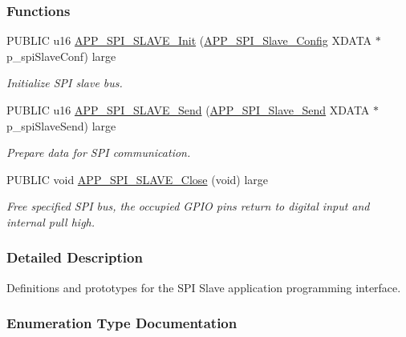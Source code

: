 \subsubsection*{Functions}
\begin{DoxyCompactItemize}
\item 
P\+U\+B\+L\+IC u16 \hyperlink{group___s_p_i___s_l_a_v_e_ga6d740478fb33ff060db8a06a1d8f502c}{A\+P\+P\+\_\+\+S\+P\+I\+\_\+\+S\+L\+A\+V\+E\+\_\+\+Init} (\hyperlink{struct_a_p_p___s_p_i___slave___config}{A\+P\+P\+\_\+\+S\+P\+I\+\_\+\+Slave\+\_\+\+Config} X\+D\+A\+TA $\ast$p\+\_\+spi\+Slave\+Conf) large
\begin{DoxyCompactList}\small\item\em Initialize S\+PI slave bus. \end{DoxyCompactList}\item 
P\+U\+B\+L\+IC u16 \hyperlink{group___s_p_i___s_l_a_v_e_gaca825a871abdd7096640f0a291d59385}{A\+P\+P\+\_\+\+S\+P\+I\+\_\+\+S\+L\+A\+V\+E\+\_\+\+Send} (\hyperlink{struct_a_p_p___s_p_i___slave___send}{A\+P\+P\+\_\+\+S\+P\+I\+\_\+\+Slave\+\_\+\+Send} X\+D\+A\+TA $\ast$p\+\_\+spi\+Slave\+Send) large
\begin{DoxyCompactList}\small\item\em Prepare data for S\+PI communication. \end{DoxyCompactList}\item 
P\+U\+B\+L\+IC void \hyperlink{group___s_p_i___s_l_a_v_e_ga6434e36bb9716105dbc2417aaec49965}{A\+P\+P\+\_\+\+S\+P\+I\+\_\+\+S\+L\+A\+V\+E\+\_\+\+Close} (void) large\hypertarget{group___s_p_i___s_l_a_v_e_ga6434e36bb9716105dbc2417aaec49965}{}\label{group___s_p_i___s_l_a_v_e_ga6434e36bb9716105dbc2417aaec49965}

\begin{DoxyCompactList}\small\item\em Free specified S\+PI bus, the occupied G\+P\+IO pins return to digital input and internal pull high. \end{DoxyCompactList}\end{DoxyCompactItemize}


\subsubsection{Detailed Description}
Definitions and prototypes for the S\+PI Slave application programming interface. 



\subsubsection{Enumeration Type Documentation}
